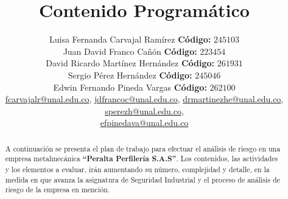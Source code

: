 \documentclass[11pt,graphicx,caption,rotating]{article}
\begin{document}
\title{{\huge Contenido Programático}}
\author{Luisa Fernanda Carvajal Ramírez \textbf{Código:} $245103$\\
	Juan David Franco Cañón \textbf{Código:} $223454$\\
	David Ricardo Martínez Hernández \textbf{Código:} $261931$\\
	Sergio Pérez Hernández \textbf{Código:} $245046$\\
	Edwin Fernando Pineda Vargas \textbf{Código:} $262100$\\
	\href{}{fcarvajalr@unal.edu.co}, \href{}{jdfrancoc@unal.edu.co}, \href{}{drmartinezhe@unal.edu.co}, \href{}{sperezh@unal.edu.co},\\ \href{}{efpinedava@unal.edu.co}}	
\date{}
\maketitle

\begin{abstract}
\noindent
A continuación se presenta el plan de trabajo para efectuar el análisis de riesgo en una empresa metalmecánica \textbf{``Peralta Perfilería S.A.S''}. Los contenidos, las actividades y los elementos a evaluar, irán aumentando su número, complejidad y detalle, en la medida en que avanza la asignatura de Seguridad Industrial y el proceso de análisis de riesgo de la empresa en mención.
\end{abstract}
\end{document}
